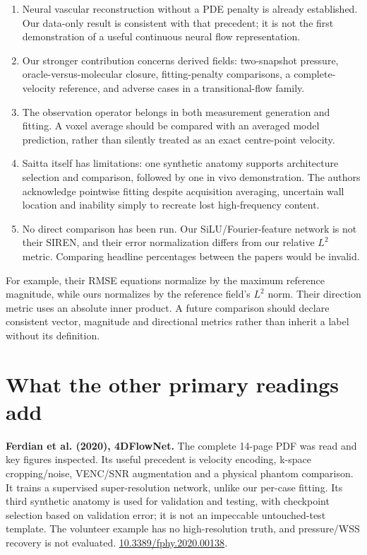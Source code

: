\documentclass[11pt,a4paper]{article}
\begin{document}
\begin{enumerate}
\item Neural vascular reconstruction without a PDE penalty is already established. Our data-only result is consistent with that precedent; it is not the first demonstration of a useful continuous neural flow representation.
\item Our stronger contribution concerns derived fields: two-snapshot pressure, oracle-versus-molecular closure, fitting-penalty comparisons, a complete-velocity reference, and adverse cases in a transitional-flow family.
\item The observation operator belongs in both measurement generation and fitting. A voxel average should be compared with an averaged model prediction, rather than silently treated as an exact centre-point velocity.
\item Saitta itself has limitations: one synthetic anatomy supports architecture selection and comparison, followed by one in vivo demonstration. The authors acknowledge pointwise fitting despite acquisition averaging, uncertain wall location and inability simply to recreate lost high-frequency content.
\item No direct comparison has been run. Our SiLU/Fourier-feature network is not their SIREN, and their error normalization differs from our relative $L^2$ metric. Comparing headline percentages between the papers would be invalid.
\end{enumerate}

For example, their RMSE equations normalize by the maximum reference magnitude, while ours normalizes by the reference field's $L^2$ norm. Their direction metric uses an absolute inner product. A future comparison should declare consistent vector, magnitude and directional metrics rather than inherit a label without its definition.

\section{What the other primary readings add}

\textbf{Ferdian et al. (2020), 4DFlowNet.} The complete 14-page PDF was read and key figures inspected. Its useful precedent is velocity encoding, k-space cropping/noise, VENC/SNR augmentation and a physical phantom comparison. It trains a supervised super-resolution network, unlike our per-case fitting. Its third synthetic anatomy is used for validation and testing, with checkpoint selection based on validation error; it is not an impeccable untouched-test template. The volunteer example has no high-resolution truth, and pressure/WSS recovery is not evaluated. \href{https://doi.org/10.3389/fphy.2020.00138}{10.3389/fphy.2020.00138}.
\end{document}

